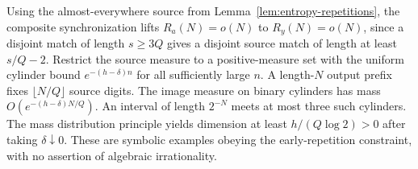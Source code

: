 Using the almost-everywhere source from Lemma~\ref{lem:entropy-repetitions}, the composite synchronization lifts \(R_a(N)=o(N)\) to \(R_y(N)=o(N)\), since a disjoint match of length \(s\ge3Q\) gives a disjoint source match of length at least \(s/Q-2\). Restrict the source measure to a positive-measure set with the uniform cylinder bound \(e^{-(h-\delta)n}\) for all sufficiently large \(n\). A length-\(N\) output prefix fixes \(\lfloor N/Q\rfloor\) source digits. The image measure on binary cylinders has mass \(O(e^{-(h-\delta)N/Q})\). An interval of length \(2^{-N}\) meets at most three such cylinders. The mass distribution principle yields dimension at least \(h/(Q\log2)>0\) after taking \(\delta\downarrow0\). These are symbolic examples obeying the early-repetition constraint, with no assertion of algebraic irrationality.
